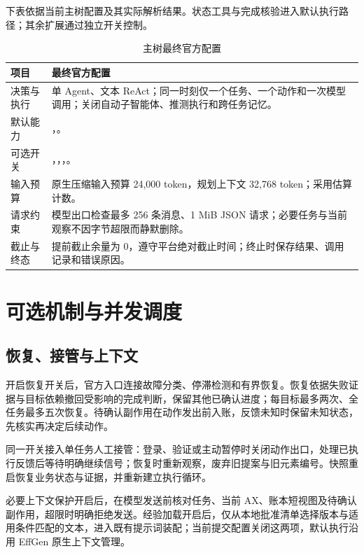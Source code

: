 \documentclass[UTF8,zihao=5,fontset=windows,a4paper]{ctexart}
\begin{document}
下表依据当前主树配置及其实际解析结果。状态工具与完成核验进入默认执行路径；其余扩展通过独立开关控制。

\begin{table}[htbp]
\caption{主树最终官方配置}\label{tab:config}
\centering\begingroup
\linespread{1.02}\fontsize{9.5}{14}\selectfont
\renewcommand{\arraystretch}{1.18}
\begin{tabularx}{\linewidth}{@{}L{31mm}Y@{}}
\toprule{}
\textbf{\color{navy}项目} & \textbf{\color{navy}最终官方配置}\\
\midrule
决策与执行 & 单 Agent、文本 ReAct；同一时刻仅一个任务、一个动作和一次模型调用；关闭自动子智能体、推测执行和跨任务记忆。\\
默认能力 & ，。\\
可选开关 & ，，，。\\
输入预算 & 原生压缩输入预算 24,000 token，规划上下文 32,768 token；采用估算计数。\\
请求约束 & 模型出口检查最多 256 条消息、1 MiB JSON 请求；必要任务与当前观察不因字节超限而静默删除。\\
截止与终态 & 提前截止余量为 0，遵守平台绝对截止时间；终止时保存结果、调用记录和错误原因。\\
\bottomrule
\end{tabularx}
\endgroup\end{table}

\section{可选机制与并发调度}

\subsection{恢复、接管与上下文}

开启恢复开关后，官方入口连接故障分类、停滞检测和有界恢复。恢复依据失败证据与目标依赖撤回受影响的完成判断，保留其他已确认进度；每目标最多两次、全任务最多五次恢复。待确认副作用在动作发出前入账，反馈未知时保留未知状态，先核实再决定后续动作。

同一开关接入单任务人工接管：登录、验证或主动暂停时关闭动作出口，处理已执行反馈后等待明确继续信号；恢复时重新观察，废弃旧提案与旧元素编号。快照重启恢复业务状态与证据，并重新建立执行循环。

必要上下文保护开启后，在模型发送前核对任务、当前 AX、账本短视图及待确认副作用，超限时明确拒绝发送。经验加载开启后，仅从本地批准清单选择版本与适用条件匹配的文本，进入既有提示词装配；当前提交配置关闭这两项，默认执行沿用 EffGen 原生上下文管理。
\end{document}

